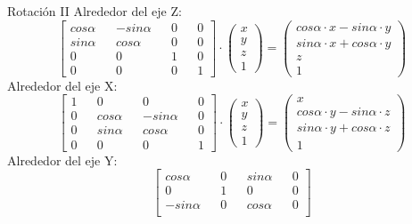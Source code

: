 \documentclass{beamer}
\begin{document}
\begin{frame}{Rotación II}
  Alrededor del eje Z:
  \begin{equation*}
  \begin{bmatrix}
    cos \alpha && -sin\alpha && 0 && 0 \\
    sin \alpha && cos\alpha && 0 && 0 \\
    0 && 0 && 1 && 0 \\
    0 && 0 && 0 && 1
  \end{bmatrix}
  \cdot
  \begin{pmatrix}
    x \\ y \\ z \\ 1
  \end{pmatrix}
  =
  \begin{pmatrix}
    cos \alpha \cdot x - sin \alpha \cdot y \\
    sin \alpha \cdot x + cos \alpha \cdot y \\
    z \\
    1
  \end{pmatrix}
  \end{equation*}
  Alrededor del eje X:
  \begin{equation*}
  \begin{bmatrix}
    1 && 0 && 0 && 0 \\
    0 && cos \alpha && -sin \alpha && 0 \\
    0 && sin \alpha && cos \alpha && 0 \\
    0 && 0 && 0 && 1
  \end{bmatrix}
  \cdot
  \begin{pmatrix}
    x \\ y \\ z \\ 1
  \end{pmatrix}
  =
  \begin{pmatrix}
    x \\
    cos \alpha \cdot y - sin \alpha \cdot z \\
    sin \alpha \cdot y + cos \alpha \cdot z \\
    1
  \end{pmatrix}
\end{equation*}
  Alrededor del eje Y:
  \begin{equation*}
  \begin{bmatrix}
    cos \alpha && 0 && sin \alpha && 0 \\
    0 && 1 && 0 && 0 \\
    - sin \alpha && 0 && cos \alpha && 0 \\

\end{bmatrix}
\end{equation*}
\end{frame}
\end{document}

